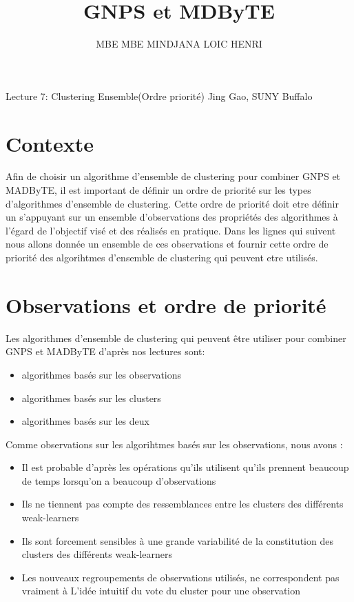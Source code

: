 \documentclass[12pt, french, latin.medieval, a4paper]{report}
\author{MBE MBE MINDJANA LOIC HENRI}
\title{GNPS et MDByTE}
\begin{document}
    
    \pagecouverture
    {Lecture 7: Clustering Ensemble(Ordre priorité)}
    {Jing Gao, SUNY Buffalo}
    
    \tableofcontents
    \vspace{20cm}
    \section{Contexte}
    Afin de choisir un algorithme d'ensemble de clustering pour combiner GNPS et MADByTE, 
    il est important de définir un ordre de priorité sur les types d'algorithmes d'ensemble de clustering.
    Cette ordre de priorité doit etre définir un s'appuyant sur un ensemble d'observations des propriétés des algorithmes à l'égard
    de l'objectif visé et des réalisés en pratique. Dans les lignes qui suivent nous allons donnée un ensemble de ces observations et fournir cette ordre 
    de priorité des algorihtmes d'ensemble de clustering qui peuvent etre utilisés.


    \section{Observations et ordre de priorité}

    Les algorithmes d'ensemble de clustering qui peuvent être utiliser pour combiner GNPS et MADByTE d'après nos lectures sont:
    \begin{itemize}
        \item algorithmes basés sur les observations
        \item algorithmes basés sur les clusters
        \item algorithmes basés sur les deux
    \end{itemize}

    Comme observations sur les algorihtmes basés sur les observations, nous avons :
    \begin{itemize}
        \item Il est probable d'après les opérations qu'ils utilisent qu'ils prennent beaucoup de temps lorsqu'on a beaucoup d'observations
        \item Ils ne tiennent pas compte des ressemblances entre les clusters des différents weak-learners
        \item Ils sont forcement sensibles à une grande variabilité de la constitution des clusters des différents weak-learners
        \item Les nouveaux regroupements de observations utilisés, ne correspondent pas vraiment à L'idée intuitif du vote du cluster pour une observation
    \end{itemize}
    
\end{document}
